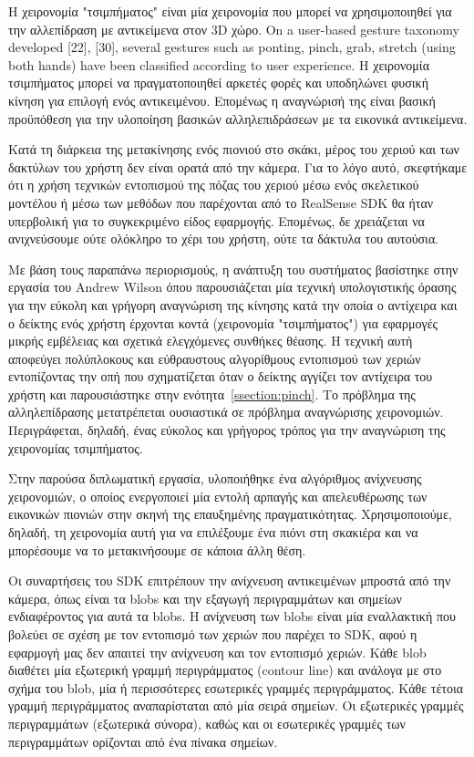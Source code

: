 Η χειρονομία "τσιμπήματος" είναι μία χειρονομία που μπορεί να χρησιμοποιηθεί για την αλλεπίδραση με αντικείμενα στον 3D χώρο. On a user-based gesture taxonomy developed [22], [30], several gestures such as ponting, pinch, grab, stretch (using both hands) have been classified according to user experience. Η χειρονομία τσιμπήματος μπορεί να πραγματοποιηθεί αρκετές φορές και υποδηλώνει φυσική κίνηση για επιλογή ενός αντικειμένου. Επομένως η αναγνώρισή της είναι βασική προϋπόθεση για την υλοποίηση βασικών αλληλεπιδράσεων με τα εικονικά αντικείμενα. 


Κατά τη διάρκεια της μετακίνησης ενός πιονιού στο σκάκι, μέρος του χεριού και των δακτύλων του χρήστη δεν είναι ορατά από την κάμερα. Για το λόγο αυτό, σκεφτήκαμε ότι η χρήση τεχνικών εντοπισμού της πόζας του χεριού μέσω ενός σκελετικού μοντέλου ή μέσω των μεθόδων που παρέχονται από το RealSense SDK θα ήταν υπερβολική για το συγκεκριμένο είδος εφαρμογής. Επομένως, δε χρειάζεται να ανιχνεύσουμε ούτε ολόκληρο το χέρι του χρήστη, ούτε τα δάκτυλα του αυτούσια. 


Με βάση τους παραπάνω περιορισμούς, η ανάπτυξη του συστήματος βασίστηκε στην εργασία του Andrew Wilson \cite{Wilson2006} όπου παρουσιάζεται μία τεχνική υπολογιστικής όρασης για την εύκολη και γρήγορη αναγνώριση της κίνησης κατά την οποία ο αντίχειρα και ο δείκτης ενός χρήστη έρχονται κοντά (χειρονομία "τσιμπήματος") για εφαρμογές μικρής εμβέλειας και σχετικά ελεγχόμενες συνθήκες θέασης. Η τεχνική αυτή αποφεύγει πολύπλοκους και εύθραυστους αλγορίθμους εντοπισμού των χεριών εντοπίζοντας την οπή που σχηματίζεται όταν ο δείκτης αγγίζει τον αντίχειρα του χρήστη και παρουσιάστηκε στην ενότητα~\ref{ssection:pinch}. Το πρόβλημα της αλληλεπίδρασης μετατρέπεται ουσιαστικά σε πρόβλημα αναγνώρισης χειρονομιών. Περιγράφεται, δηλαδή, ένας εύκολος και γρήγορος τρόπος για την αναγνώριση της χειρονομίας τσιμπήματος. 


Στην παρούσα διπλωματική εργασία, υλοποιήθηκε ένα αλγόριθμος ανίχνευσης χειρονομιών, ο οποίος ενεργοποιεί μία εντολή αρπαγής και απελευθέρωσης των εικονικών πιονιών στην σκηνή της επαυξημένης πραγματικότητας. Χρησιμοποιούμε, δηλαδή, τη χειρονομία αυτή για να επιλέξουμε ένα πιόνι στη σκακιέρα και να μπορέσουμε να το μετακινήσουμε σε κάποια άλλη θέση.

Οι συναρτήσεις του SDK επιτρέπουν την ανίχνευση αντικειμένων μπροστά από την κάμερα, όπως είναι τα blobs και την εξαγωγή περιγραμμάτων και σημείων ενδιαφέροντος για αυτά τα blobs. Η ανίχνευση των blobs είναι μία εναλλακτική που βολεύει σε σχέση με τον εντοπισμό των χεριών που παρέχει το SDK, αφού η εφαρμογή μας δεν απαιτεί την ανίχνευση και τον εντοπισμό χεριών. Κάθε blob διαθέτει μία εξωτερική γραμμή περιγράμματος (contour line) και ανάλογα με στο σχήμα του blob, μία ή περισσότερες εσωτερικές γραμμές περιγράμματος. Κάθε τέτοια γραμμή περιγράμματος αναπαρίσταται από μία σειρά σημείων. Οι εξωτερικές γραμμές περιγραμμάτων (εξωτερικά σύνορα), καθώς και οι εσωτερικές γραμμές των περιγραμμάτων ορίζονται από ένα πίνακα σημείων.


